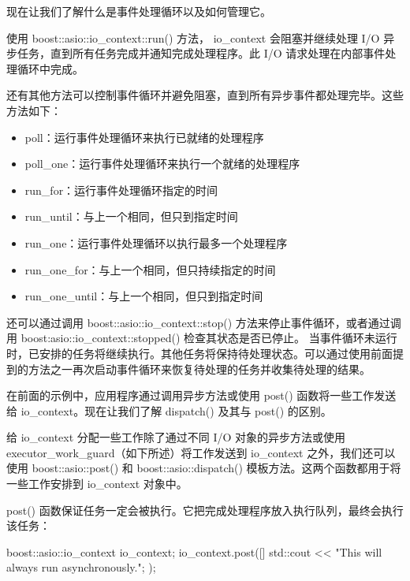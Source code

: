 现在让我们了解什么是事件处理循环以及如何管理它。


使用 boost::asio::io\_context::run() 方法， io\_context 会阻塞并继续处理 I/O 异步任务，直到所有任务完成并通知完成处理程序。此 I/O 请求处理在内部事件处理循环中完成。

还有其他方法可以控制事件循环并避免阻塞，直到所有异步事件都处理完毕。这些方法如下：

\begin{itemize}
\item
poll：运行事件处理循环来执行已就绪的处理程序

\item
poll\_one：运行事件处理循环来执行一个就绪的处理程序

\item
run\_for：运行事件处理循环指定的时间

\item
run\_until：与上一个相同，但只到指定时间

\item
run\_one：运行事件处理循环以执行最多一个处理程序

\item
run\_one\_for：与上一个相同，但只持续指定的时间

\item
run\_one\_until：与上一个相同，但只到指定时间
\end{itemize}

还可以通过调用 boost::asio::io\_context::stop() 方法来停止事件循环，或者通过调用 boost:asio::io\_context::stopped() 检查其状态是否已停止。
当事件循环未运行时，已安排的任务将继续执行。其他任务将保持待处理状态。可以通过使用前面提到的方法之一再次启动事件循环来恢复待处理的任务并收集待处理的结果。

在前面的示例中，应用程序通过调用异步方法或使用 post() 函数将一些工作发送给 io\_context。现在让我们了解 dispatch() 及其与 post() 的区别。

给 io\_context 分配一些工作除了通过不同 I/O 对象的异步方法或使用 executor\_work\_guard（如下所述）将工作发送到 io\_context 之外，我们还可以使用 boost::asio::post() 和 boost::asio::dispatch() 模板方法。这两个函数都用于将一些工作安排到 io\_context 对象中。

post() 函数保证任务一定会被执行。它把完成处理程序放入执行队列，最终会执行该任务：

\begin{cpp}
boost::asio::io_context io_context;
io_context.post([] {
    std::cout << "This will always run asynchronously.\n";
});
\end{cpp}

